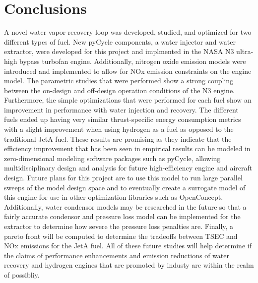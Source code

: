 \documentclass[12pt]{new-aiaa}
\begin{document}
\section{Conclusions}
A novel water vapor recovery loop was developed, studied, and optimized for two different types of fuel.
New pyCycle components, a water injector and water extractor, were developed for this project and implmented in the NASA N3 ultra-high bypass turbofan engine.
Additionally, nitrogen oxide emission models were introduced and implemented to allow for NOx emission constraints on the engine model.
The parametric studies that were performed show a strong coupling between the on-design and off-design operation conditions of the N3 engine.
Furthermore, the simple optimizations that were performed for each fuel show an improvement in performance with water injection and recovery.
The different fuels ended up having very similar thrust-specific energy consumption metrics with a slight improvement when using hydrogen as a fuel as opposed to the traditional JetA fuel.
These results are promising as they indicate that the efficiency improvement that has been seen in empirical results can be modeled in zero-dimensional modeling software packages such as pyCycle, allowing multidisciplinary design and analysis for future high-efficiency engine and aircraft design.
Future plans for this project are to use this model to run large parallel sweeps of the model design space and to eventually create a surrogate model of this engine for use in other optimization libraries such as OpenConcept.
Additionally, water condensor models may be researched in the future so that a fairly accurate condensor and pressure loss model can be implemented for the extractor to determine how severe the pressure loss penalties are.
Finally, a pareto front will be computed to determine the tradeoffs between TSEC and NOx emissions for the JetA fuel.
All of these future studies will help determine if the claims of performance enhancements and emission reductions of water recovery and hydrogen engines that are promoted by industy are within the realm of possibliy.





\end{document}
